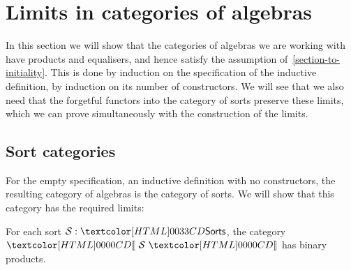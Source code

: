 \section{Limits in categories of algebras}

In this section we will show that the categories of algebras we are
working with have products and equalisers, and hence satisfy the
assumption of~\cref{section-to-initiality}. This is done by induction
on the specification of the inductive definition, \ie by induction on
its number of constructors. We will see that we also need that the
forgetful functors into the category of sorts preserve these limits,
which we can prove simultaneously with the construction of the limits.

\subsection{Sort categories}

For the empty specification, an inductive definition with no
constructors, the resulting category of algebras is the category of
sorts. We will show that this category has the required limits:

\begin{lemma}
  \label{sorts-products}
  For each sort $\Ss : \sortsty$, the category $\SortCat{\Ss}$ has
  binary products.
\end{lemma}

